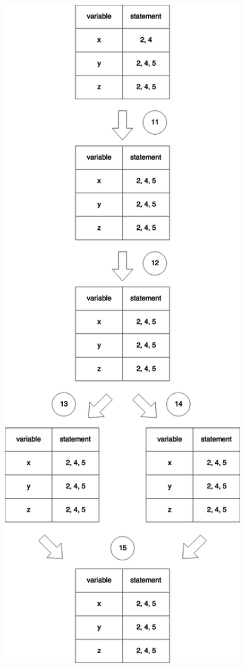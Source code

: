 \documentclass[12pt]{article}
\begin{document}
{{{{{{{{{{{{{{\begin{center}
\noindent
\begin{minipage}{15em}
\begin{flushleft}
\noindent
\includegraphics[width=1.15\textwidth]{affects3.png}

\end{flushleft}
\end{minipage}
\end{center}}}}}}}}}}}}}}}
\end{document}
